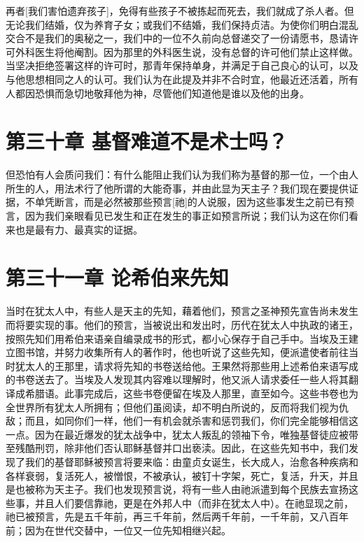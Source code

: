 再者[我们害怕遗弃孩子]，免得有些孩子不被拣起而死去，我们就成了杀人者。但无论我们结婚，仅为养育子女；或我们不结婚，我们保持贞洁。为使你们明白混乱交合不是我们的奥秘之一，我们中的一位不久前向总督递交了一份请愿书，恳请许可外科医生将他阉割。因为那里的外科医生说，没有总督的许可他们禁止这样做。当坚决拒绝签署这样的许可时，那青年保持单身，并满足于自己良心的认可，以及与他思想相同之人的认可。我们认为在此提及并非不合时宜，他最近还活着，所有人都因恐惧而急切地敬拜他为神，尽管他们知道他是谁以及他的出身。\par


\section{第三十章 基督难道不是术士吗？}

但恐怕有人会质问我们：有什么能阻止我们认为我们称为基督的那一位，一个由人所生的人，用法术行了他所谓的大能奇事，并由此显为天主子？我们现在要提供证据，不单凭断言，而是必然被那些预言[祂]的人说服，因为这些事发生之前已有预言，因为我们亲眼看见已发生和正在发生的事正如预言所说；我们认为这在你们看来也是最有力、最真实的证据。\par


\section{第三十一章 论希伯来先知}

当时在犹太人中，有些人是天主的先知，藉着他们，预言之圣神预先宣告尚未发生而将要实现的事。他们的预言，当被说出和发出时，历代在犹太人中执政的诸王，按照先知们用希伯来语亲自编录成书的形式，都小心保存于自己手中。当埃及王建立图书馆，并努力收集所有人的著作时，他也听说了这些先知，便派遣使者前往当时犹太人的王那里，请求将先知的书卷送给他。王果然将那些用上述希伯来语写成的书卷送去了。当埃及人发现其内容难以理解时，他又派人请求委任一些人将其翻译成希腊语。此事完成后，这些书卷便留在埃及人那里，直至如今。这些书卷也为全世界所有犹太人所拥有；但他们虽阅读，却不明白所说的，反而将我们视为仇敌；而且，如同你们一样，他们一有机会就杀害和惩罚我们，你们完全能够相信这一点。因为在最近爆发的犹太战争中，犹太人叛乱的领袖下令，唯独基督徒应被带至残酷刑罚，除非他们否认耶稣基督并口出亵渎。因此，在这些先知书中，我们发现了我们的基督耶稣被预言将要来临：由童贞女诞生，长大成人，治愈各种疾病和各样衰弱，复活死人，被憎恨，不被承认，被钉十字架，死亡，复活，升天，并且是也被称为天主子。我们也发现预言说，将有一些人由祂派遣到每个民族去宣扬这些事，并且人们要信靠祂，更是在外邦人中（而非在犹太人中）。在祂显现之前，祂已被预言，先是五千年前，再三千年前，然后两千年前，一千年前，又八百年前；因为在世代交替中，一位又一位先知相继兴起。\par

